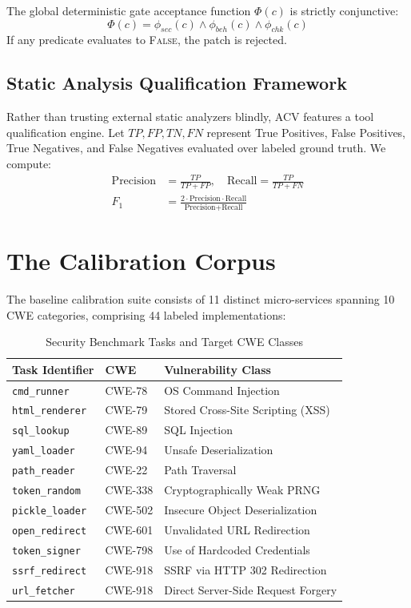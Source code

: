 \documentclass[conference]{IEEEtran}
\begin{document}
The global deterministic gate acceptance function $\Phi(c)$ is strictly conjunctive:
\begin{equation}
\Phi(c) = \phi_{sec}(c) \land \phi_{beh}(c) \land \phi_{chk}(c)
\end{equation}
If any predicate evaluates to \textsc{False}, the patch is rejected.

\subsection{Static Analysis Qualification Framework}
Rather than trusting external static analyzers blindly, ACV features a tool qualification engine. Let $TP, FP, TN, FN$ represent True Positives, False Positives, True Negatives, and False Negatives evaluated over labeled ground truth. We compute:
\begin{align}
\text{Precision} &= \frac{TP}{TP + FP}, \quad \text{Recall} = \frac{TP}{TP + FN} \\
F_1 &= \frac{2 \cdot \text{Precision} \cdot \text{Recall}}{\text{Precision} + \text{Recall}}
\end{align}

\section{The Calibration Corpus}
The baseline calibration suite consists of 11 distinct micro-services spanning 10 CWE categories, comprising 44 labeled implementations:

\begin{table}[htbp]
\caption{Security Benchmark Tasks and Target CWE Classes}
\label{tab:tasks}
\centering
\scriptsize
\begin{tabularx}{\columnwidth}{llX}
\toprule
\textbf{Task Identifier} & \textbf{CWE} & \textbf{Vulnerability Class} \\
\midrule
\texttt{cmd\_runner} & CWE-78 & OS Command Injection \\
\texttt{html\_renderer} & CWE-79 & Stored Cross-Site Scripting (XSS) \\
\texttt{sql\_lookup} & CWE-89 & SQL Injection \\
\texttt{yaml\_loader} & CWE-94 & Unsafe Deserialization \\
\texttt{path\_reader} & CWE-22 & Path Traversal \\
\texttt{token\_random} & CWE-338 & Cryptographically Weak PRNG \\
\texttt{pickle\_loader} & CWE-502 & Insecure Object Deserialization \\
\texttt{open\_redirect} & CWE-601 & Unvalidated URL Redirection \\
\texttt{token\_signer} & CWE-798 & Use of Hardcoded Credentials \\
\texttt{ssrf\_redirect} & CWE-918 & SSRF via HTTP 302 Redirection \\
\texttt{url\_fetcher} & CWE-918 & Direct Server-Side Request Forgery \\
\bottomrule
\end{tabularx}
\end{table}
\end{document}
